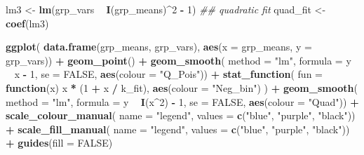 \documentclass[
  12pt,
]{book}
\newenvironment{Shaded}{\begin{snugshade}}{\end{snugshade}}
\newcommand{\CommentTok}[1]{\textcolor[rgb]{0.56,0.35,0.01}{\textit{#1}}}
\newcommand{\ControlFlowTok}[1]{\textcolor[rgb]{0.13,0.29,0.53}{\textbf{#1}}}
\newcommand{\DataTypeTok}[1]{\textcolor[rgb]{0.13,0.29,0.53}{#1}}
\newcommand{\DecValTok}[1]{\textcolor[rgb]{0.00,0.00,0.81}{#1}}
\newcommand{\KeywordTok}[1]{\textcolor[rgb]{0.13,0.29,0.53}{\textbf{#1}}}
\newcommand{\NormalTok}[1]{#1}
\newcommand{\OperatorTok}[1]{\textcolor[rgb]{0.81,0.36,0.00}{\textbf{#1}}}
\newcommand{\OtherTok}[1]{\textcolor[rgb]{0.56,0.35,0.01}{#1}}
\newcommand{\StringTok}[1]{\textcolor[rgb]{0.31,0.60,0.02}{#1}}
\begin{document}
\begin{Shaded}
\begin{Highlighting}[]
\NormalTok{lm3 <-}\StringTok{ }\KeywordTok{lm}\NormalTok{(grp_vars }\OperatorTok{~}\StringTok{ }\KeywordTok{I}\NormalTok{(grp_means)}\OperatorTok{^}\DecValTok{2} \OperatorTok{-}\StringTok{ }\DecValTok{1}\NormalTok{) }\CommentTok{## quadratic fit}
\NormalTok{quad_fit <-}\StringTok{ }\KeywordTok{coef}\NormalTok{(lm3)}

\KeywordTok{ggplot}\NormalTok{(}
  \KeywordTok{data.frame}\NormalTok{(grp_means, grp_vars),}
  \KeywordTok{aes}\NormalTok{(}\DataTypeTok{x =}\NormalTok{ grp_means, }\DataTypeTok{y =}\NormalTok{ grp_vars)) }\OperatorTok{+}
\StringTok{  }\KeywordTok{geom_point}\NormalTok{() }\OperatorTok{+}
\StringTok{  }\KeywordTok{geom_smooth}\NormalTok{(}
    \DataTypeTok{method =} \StringTok{"lm"}\NormalTok{, }\DataTypeTok{formula =}\NormalTok{ y }\OperatorTok{~}\StringTok{ }\NormalTok{x }\OperatorTok{-}\StringTok{ }\DecValTok{1}\NormalTok{, }\DataTypeTok{se =} \OtherTok{FALSE}\NormalTok{,}
    \KeywordTok{aes}\NormalTok{(}\DataTypeTok{colour =} \StringTok{"Q_Pois"}\NormalTok{)) }\OperatorTok{+}
\StringTok{  }\KeywordTok{stat_function}\NormalTok{(}
    \DataTypeTok{fun =} \ControlFlowTok{function}\NormalTok{(x) x }\OperatorTok{*}\StringTok{ }\NormalTok{(}\DecValTok{1} \OperatorTok{+}\StringTok{ }\NormalTok{x }\OperatorTok{/}\StringTok{ }\NormalTok{k_fit),}
    \KeywordTok{aes}\NormalTok{(}\DataTypeTok{colour =} \StringTok{"Neg_bin"}\NormalTok{)}
\NormalTok{  ) }\OperatorTok{+}
\StringTok{  }\KeywordTok{geom_smooth}\NormalTok{(}
    \DataTypeTok{method =} \StringTok{"lm"}\NormalTok{, }\DataTypeTok{formula =}\NormalTok{ y }\OperatorTok{~}\StringTok{ }\KeywordTok{I}\NormalTok{(x}\OperatorTok{^}\DecValTok{2}\NormalTok{) }\OperatorTok{-}\StringTok{ }\DecValTok{1}\NormalTok{, }\DataTypeTok{se =} \OtherTok{FALSE}\NormalTok{,}
    \KeywordTok{aes}\NormalTok{(}\DataTypeTok{colour =} \StringTok{"Quad"}\NormalTok{)) }\OperatorTok{+}
\StringTok{  }\KeywordTok{scale_colour_manual}\NormalTok{(}
    \DataTypeTok{name =} \StringTok{"legend"}\NormalTok{,}
    \DataTypeTok{values =} \KeywordTok{c}\NormalTok{(}\StringTok{"blue"}\NormalTok{, }\StringTok{"purple"}\NormalTok{, }\StringTok{"black"}\NormalTok{)) }\OperatorTok{+}
\StringTok{  }\KeywordTok{scale_fill_manual}\NormalTok{(}
    \DataTypeTok{name =} \StringTok{"legend"}\NormalTok{,}
    \DataTypeTok{values =} \KeywordTok{c}\NormalTok{(}\StringTok{"blue"}\NormalTok{, }\StringTok{"purple"}\NormalTok{, }\StringTok{"black"}\NormalTok{)) }\OperatorTok{+}
\StringTok{  }\KeywordTok{guides}\NormalTok{(}\DataTypeTok{fill =} \OtherTok{FALSE}\NormalTok{)}
\end{Highlighting}
\end{Shaded}
\end{document}
